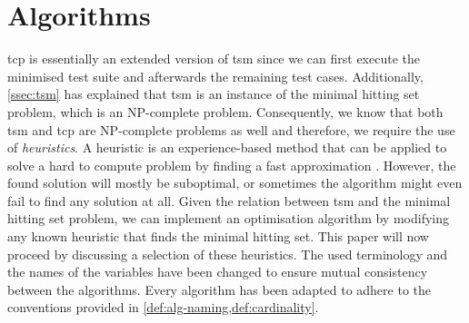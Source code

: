 
\section{Algorithms}
\label{sec:relatedwork-algorithms}
\acrshort{tcp} is essentially an extended version of \acrshort{tsm} since we can first execute the minimised test suite and afterwards the remaining test cases. Additionally, \cref{ssec:tsm} has explained that \acrshort{tsm} is an instance of the minimal hitting set problem, which is an NP-complete problem. Consequently, we know that both \acrshort{tsm} and \acrshort{tcp} are NP-complete problems as well and therefore, we require the use of \emph{heuristics}. A heuristic is an experience-based method that can be applied to solve a hard to compute problem by finding a fast approximation \cite{6588537}. However, the found solution will mostly be suboptimal, or sometimes the algorithm might even fail to find any solution at all. Given the relation between \acrshort{tsm} and the minimal hitting set problem, we can implement an optimisation algorithm by modifying any known heuristic that finds the minimal hitting set. This paper will now proceed by discussing a selection of these heuristics. The used terminology and the names of the variables have been changed to ensure mutual consistency between the algorithms. Every algorithm has been adapted to adhere to the conventions provided in \cref{def:alg-naming,def:cardinality}.

